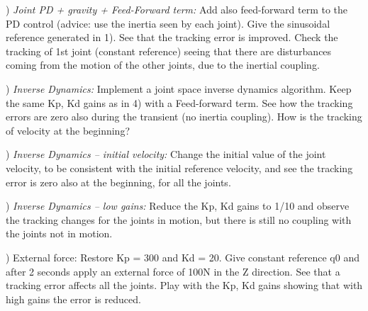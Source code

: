 \documentclass{report}
\begin{document}
\quad

) \textit{Joint  PD + gravity + Feed-Forward term:}
Add also feed-forward term to the PD control (advice: use the inertia seen by each joint). Give the sinusoidal reference generated in 1). See that the tracking error is improved. Check the tracking of 1st joint (constant reference) seeing that there are disturbances coming from the motion of the other joints, due to the inertial coupling.

\quad

)\textit{ Inverse Dynamics:}
Implement a joint space inverse dynamics algorithm. Keep the same Kp, Kd gains as in 4) with a Feed-forward term. See how the tracking errors are zero also during the transient (no inertia coupling). How is the tracking of velocity at the beginning? 

\quad

)\textit{ Inverse Dynamics – initial velocity:}
Change the initial value of the joint velocity, to be consistent with the initial reference velocity, and see the tracking error is zero also at the beginning, for all the joints. 

\quad

) \textit{ Inverse Dynamics – low gains:}
Reduce the Kp, Kd gains to 1/10 and observe the tracking changes for the joints in motion, but there is still no coupling with the joints not in motion.

\quad

) External force:
Restore Kp = 300 and Kd = 20. Give constant reference q0  and after 2 seconds apply an external force of 100N in the Z direction. See that a tracking error affects all the joints. Play with the Kp, Kd gains showing that with high gains the error is reduced.
 
\end{document}
